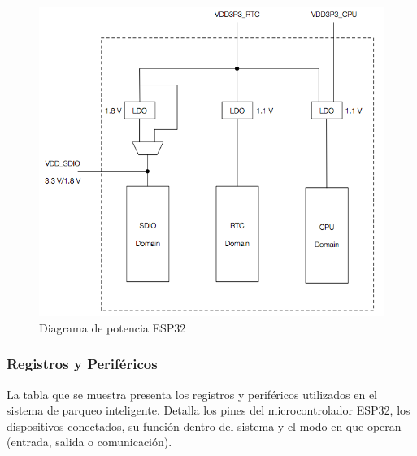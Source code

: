 \documentclass[12pt,a4paper]{article}
\begin{document}
\begin{figure}[H]
    \centering
    \includegraphics[width=0.5\linewidth]{Imagenes/power.png}
    \caption{Diagrama de potencia ESP32 \cite{esp32}}
    \label{fig:3}
\end{figure}

\subsubsection{Registros y Periféricos}
La tabla que se muestra presenta los registros y periféricos utilizados en el sistema de parqueo inteligente. Detalla los pines del microcontrolador ESP32, los dispositivos conectados, su función dentro del sistema y el modo en que operan (entrada, salida o comunicación). 
\end{document}

